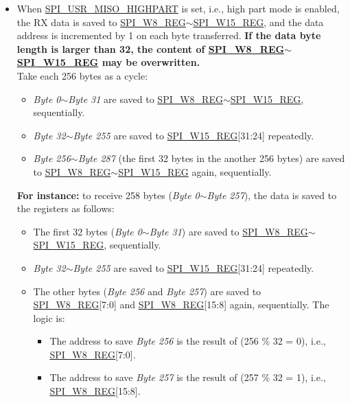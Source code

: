 \documentclass[main\_\_EN.tex]{subfiles}
\begin{document}
\begin{itemize}
\begin{itemize}
        \item When \hyperref[fielddesc:SPIUSRMISOHIGHPART]{SPI\_USR\_MISO\_HIGHPART} is set, i.e., high part mode is enabled, the RX data is saved to \hyperref[regdesc:SPIW0REG]{SPI\_W8\_REG}$\sim$\hyperref[regdesc:SPIW0REG]{SPI\_W15\_REG}, and the data address is incremented by 1 on each byte transferred. \textbf{If the data byte length is larger than 32, the content of \hyperref[regdesc:SPIW0REG]{SPI\_W8\_REG}$\sim$\hyperref[regdesc:SPIW0REG]{SPI\_W15\_REG} may be overwritten.} \\
        Take each 256 bytes as a cycle:
        \begin{itemize}
            \item \emph{Byte 0}$\sim$\emph{Byte 31} are saved to \hyperref[regdesc:SPIW0REG]{SPI\_W8\_REG}$\sim$\hyperref[regdesc:SPIW0REG]{SPI\_W15\_REG}, sequentially.
            \item \emph{Byte 32}$\sim$\emph{Byte 255} are saved to \hyperref[regdesc:SPIW0REG]{SPI\_W15\_REG}[31:24] repeatedly.
            \item \emph{Byte 256}$\sim$\emph{Byte 287} (the first 32 bytes in the another 256 bytes) are saved to \hyperref[regdesc:SPIW0REG]{SPI\_W8\_REG}$\sim$\hyperref[regdesc:SPIW0REG]{SPI\_W15\_REG} again, sequentially.
        \end{itemize}

        \textbf{For instance:} to receive 258 bytes (\emph{Byte 0}$\sim$\emph{Byte 257}), the data is saved to the registers as follows:
        \begin{itemize}
            \item The first 32 bytes (\emph{Byte 0}$\sim$\emph{Byte 31}) are saved to \hyperref[regdesc:SPIW0REG]{SPI\_W8\_REG}$\sim$\hyperref[regdesc:SPIW0REG]{SPI\_W15\_REG}, sequentially.
            \item \emph{Byte 32}$\sim$\emph{Byte 255} are saved to \hyperref[regdesc:SPIW0REG]{SPI\_W15\_REG}[31:24] repeatedly.
            \item The other bytes (\emph{Byte 256} and \emph{Byte 257}) are saved to \hyperref[regdesc:SPIW0REG]{SPI\_W8\_REG}[7:0] and \hyperref[regdesc:SPIW0REG]{SPI\_W8\_REG}[15:8] again, sequentially. The logic is:
            \begin{itemize}
                \item The address to save \emph{Byte 256} is the result of (256 \% 32 = 0), i.e., \hyperref[regdesc:SPIW0REG]{SPI\_W8\_REG}[7:0].
                \item The address to save \emph{Byte 257} is the result of (257 \% 32 = 1), i.e., \hyperref[regdesc:SPIW0REG]{SPI\_W8\_REG}[15:8].
            \end{itemize}
        \end{itemize}
    \end{itemize}
\end{itemize}
\end{document}
